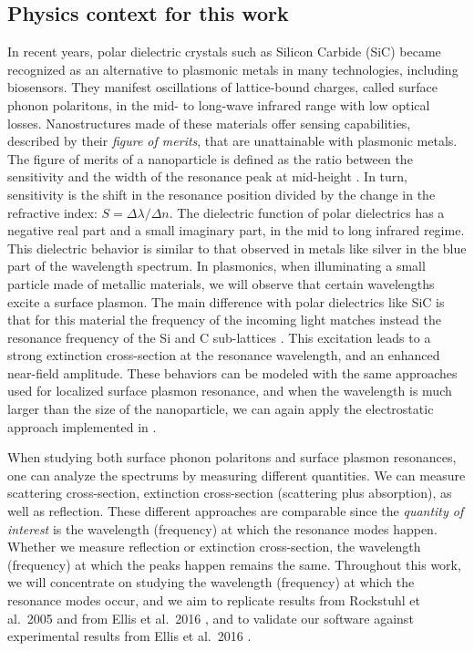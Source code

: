 \subsection{Physics context for this work}

In recent years, polar dielectric crystals such as Silicon Carbide (SiC) became recognized as an alternative to plasmonic metals in many technologies, including biosensors. 
They manifest oscillations of lattice-bound charges, called surface phonon polaritons, in the mid- to long-wave infrared range with low optical losses.
Nanostructures made of these materials offer sensing capabilities, described by their \emph{figure of merits}, that are unattainable with plasmonic metals. 
The figure of merits of a nanoparticle is defined as the ratio between the sensitivity and the width of the resonance peak at mid-height \cite{otte-etal-2012}. 
In turn, sensitivity is the shift in the resonance position divided by the change in the refractive index: 
$S = \Delta \lambda / \Delta n$.
The dielectric function of polar dielectrics has a negative real part and a small imaginary part, in the mid to long infrared regime. 
This dielectric behavior is similar to that observed in metals like silver in the blue part of the wavelength spectrum. 
In plasmonics, when illuminating a small particle made of metallic materials, we will observe that certain wavelengths excite a surface plasmon. 
The main difference with polar dielectrics like SiC is that for this material the frequency of the incoming light matches instead the resonance frequency of the Si and C sub-lattices \cite{caldwell2015,rockstuhl2005}. 
This excitation leads to a strong extinction cross-section at the resonance wavelength, and an enhanced near-field amplitude. 
These behaviors can be modeled with the same approaches used for localized surface plasmon resonance, and when the wavelength is much larger than the size
of the nanoparticle, we can again apply the electrostatic approach implemented in \pygbe \cite{ClementiETal2017, ClementiETal2019}.

When studying both surface phonon polaritons and surface plasmon resonances, one can analyze the spectrums by measuring different quantities. 
We can measure scattering cross-section, extinction cross-section (scattering plus absorption), as well as reflection. 
These different approaches are comparable since the \textit{quantity of interest} is the wavelength (frequency) at which the resonance modes happen. 
Whether we measure reflection or extinction cross-section, the wavelength (frequency) at which the peaks happen remains the same. 
Throughout this work, we will concentrate on studying the wavelength (frequency) at which the resonance modes occur, 
and we aim to replicate results from Rockstuhl et al.\ 2005 \cite{rockstuhl2005} and from Ellis et al.\ 2016 \cite{ellis2016}, 
and to validate our software against experimental results from Ellis et al.\ 2016 \cite{ellis2016}.
